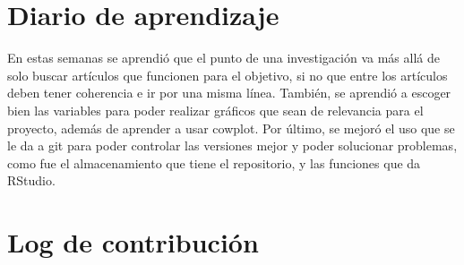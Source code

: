 \documentclass[12pt]{article}
\begin{document}
\section{Diario de aprendizaje}
En estas semanas se aprendió que el punto de una investigación va más allá de solo buscar artículos 
que funcionen para el objetivo, si no que entre los artículos deben tener coherencia e ir por una misma 
línea. También, se aprendió a escoger bien las variables para poder realizar gráficos que sean de 
relevancia para el proyecto, además de aprender a usar cowplot. Por último, se mejoró el uso 
que se le da a git para poder controlar las versiones mejor y poder solucionar problemas, como fue 
el almacenamiento que tiene el repositorio, y las funciones que da RStudio.

\section{Log de contribución}
\end{document}
